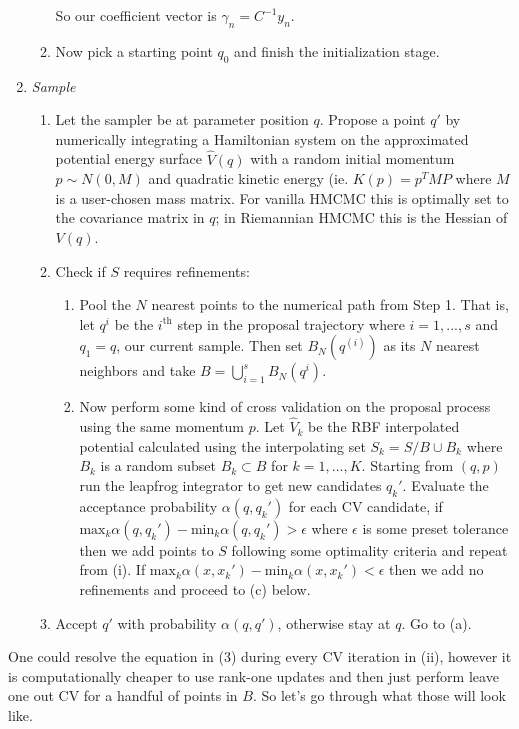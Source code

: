 \documentclass[12pt,a4paper]{article}
\begin{document}
\begin{enumerate}
\begin{enumerate}
So our coefficient vector is $\gamma_n = C^{-1} y_n$.

\item Now pick a starting point $q_0$ and finish the initialization stage.

\end{enumerate}

\item \textit{Sample}
\begin{enumerate}
\item Let the sampler be at parameter position $q$.  Propose a point $q'$ by numerically integrating a Hamiltonian system on the approximated potential energy surface $\hat{V}(q)$ with a random initial momentum $p \sim N(0, M)$ and quadratic kinetic energy (ie. $K(p) = p^T M P$ where $M$ is a user-chosen mass matrix.  For vanilla HMCMC this is optimally set to the covariance matrix in $q$; in Riemannian HMCMC this is the Hessian of $V(q)$.
\item Check if $S$ requires refinements:
\begin{enumerate}
\item Pool the $N$ nearest points to the numerical path from Step 1.  That is, let $q^{i}$ be the $i^{\text{th}}$ step in the proposal trajectory where $i = 1,...,s$ and $q_1 = q$, our current sample.  Then set $B_N(q^{(i)})$ as its $N$ nearest neighbors and take $B = \bigcup\limits_{i=1}^{s}B_N(q^{i})$.
\item Now perform some kind of cross validation on the proposal process using the same momentum $p$.  Let $\hat{V}_k$ be the RBF interpolated potential calculated using the interpolating set $S_k = S/B \cup B_k$ where $B_k$ is a random subset $B_k \subset B$ for $k =1,...,K$.  Starting from $(q,p)$ run the leapfrog integrator to get new candidates $q_k'$.  Evaluate the acceptance probability $\alpha(q,q_k')$ for each CV candidate, if $\text{max}_k \alpha(q, q_k') - \text{min}_k \alpha(q, q_k') > \epsilon$ where $\epsilon$ is some preset tolerance then we add points to $S$ following some optimality criteria and repeat from (i).  If $\text{max}_k \alpha(x, x_k') - \text{min}_k \alpha(x, x_k') < \epsilon$ then we add no refinements and proceed to (c) below.
\end{enumerate}
\item  Accept $q'$ with probability $\alpha(q,q')$, otherwise stay at $q$.  Go to (a).
\end{enumerate}
\end{enumerate}

One could resolve the equation in (3) during every CV iteration in (ii), however it is computationally cheaper to use rank-one updates and then just perform leave one out CV for a handful of points in $B$.  So let's go through what those will look like.
\end{document}
